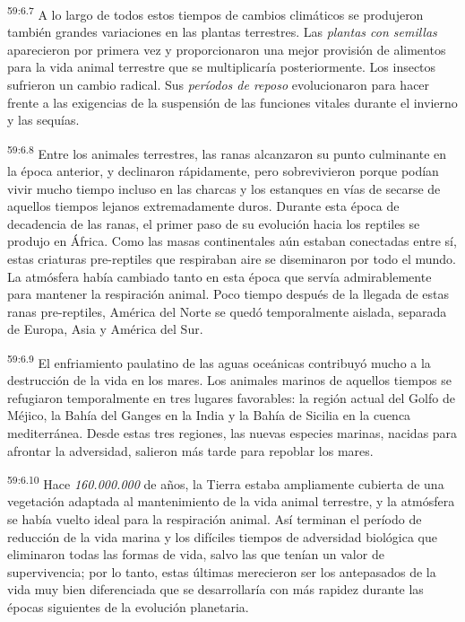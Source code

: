 \par
\textsuperscript{59:6.7} A lo largo de todos estos tiempos de cambios climáticos se produjeron también grandes variaciones en las plantas terrestres. Las \textit{plantas con semillas} aparecieron por primera vez y proporcionaron una mejor provisión de alimentos para la vida animal terrestre que se multiplicaría posteriormente. Los insectos sufrieron un cambio radical. Sus \textit{períodos de reposo} evolucionaron para hacer frente a las exigencias de la suspensión de las funciones vitales durante el invierno y las sequías.

\par
\textsuperscript{59:6.8} Entre los animales terrestres, las ranas alcanzaron su punto culminante en la época anterior, y declinaron rápidamente, pero sobrevivieron porque podían vivir mucho tiempo incluso en las charcas y los estanques en vías de secarse de aquellos tiempos lejanos extremadamente duros. Durante esta época de decadencia de las ranas, el primer paso de su evolución hacia los reptiles se produjo en África. Como las masas continentales aún estaban conectadas entre sí, estas criaturas pre-reptiles que respiraban aire se diseminaron por todo el mundo. La atmósfera había cambiado tanto en esta época que servía admirablemente para mantener la respiración animal. Poco tiempo después de la llegada de estas ranas pre-reptiles, América del Norte se quedó temporalmente aislada, separada de Europa, Asia y América del Sur.

\par
\textsuperscript{59:6.9} El enfriamiento paulatino de las aguas oceánicas contribuyó mucho a la destrucción de la vida en los mares. Los animales marinos de aquellos tiempos se refugiaron temporalmente en tres lugares favorables: la región actual del Golfo de Méjico, la Bahía del Ganges en la India y la Bahía de Sicilia en la cuenca mediterránea. Desde estas tres regiones, las nuevas especies marinas, nacidas para afrontar la adversidad, salieron más tarde para repoblar los mares.

\par
\textsuperscript{59:6.10} Hace \textit{160.000.000} de años, la Tierra estaba ampliamente cubierta de una vegetación adaptada al mantenimiento de la vida animal terrestre, y la atmósfera se había vuelto ideal para la respiración animal. Así terminan el período de reducción de la vida marina y los difíciles tiempos de adversidad biológica que eliminaron todas las formas de vida, salvo las que tenían un valor de supervivencia; por lo tanto, estas últimas merecieron ser los antepasados de la vida muy bien diferenciada que se desarrollaría con más rapidez durante las épocas siguientes de la evolución planetaria.

